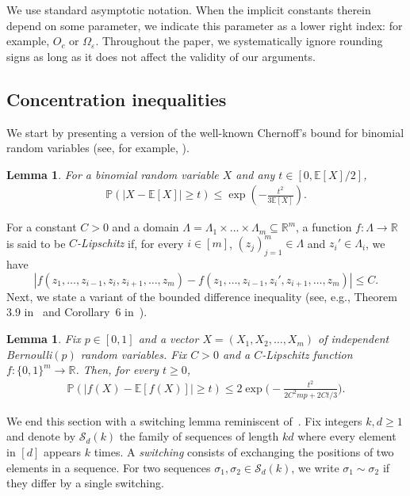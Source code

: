 \documentclass[reqno,final,a4paper]{amsart}
\newtheorem{lemma}[thm]{Lemma}
\theoremstyle{definition}
\newcommand{\cS}{\mathcal{S}}
\def\eps{\varepsilon}
\newcommand{\1}{\mathbbm{1}}
\begin{document}
We use standard asymptotic notation. When the implicit constants therein depend on some parameter, we indicate this parameter as a lower right index: for example, $O_c$ or $\Omega_\eps$. Throughout the paper, we systematically ignore rounding signs as long as it does not affect the validity of our arguments.

\subsection{Concentration inequalities}
We start by presenting a version of the well-known Chernoff's bound for binomial random variables (see, for example, \cite[Theorem 2.1]{JLR00}).
\begin{lemma}\label{chernoff}
For a binomial random variable $X$ and any $t\in [0,\mathbb E[X]/2]$, 
\begin{align*}
\mathbb{P}\left(\big|X-\mathbb E[X]\big|\ge t\right)\le \exp\left(-\frac{t^2}{3\mathbb E[X]}\right).
\end{align*}
\end{lemma}

For a constant $C > 0$ and a domain $\Lambda = \Lambda_1\times\ldots\times \Lambda_m\subseteq \mathbb R^m$, a function $f: \Lambda\to \mathbb R$ is said to be \emph{$C$-Lipschitz} if, for every $i\in [m]$, $(z_j)_{j=1}^m\in \Lambda$ and $z_i'\in \Lambda_i$, we have
\[|f(z_1,\ldots, z_{i-1}, z_i, z_{i+1},\ldots, z_m) - f(z_1,\ldots, z_{i-1}, z_i', z_{i+1},\ldots , z_m)| \le C.\]
Next, we state a variant of the bounded difference inequality (see, e.g., Theorem 3.9 in~\cite{M98} and Corollary~6 in~\cite{War16}).

\begin{lemma}\label{azuma}
Fix $p\in [0,1]$ and a vector $X = (X_1,X_2,\ldots, X_m)$ of independent Bernoulli$(p)$ random variables.
Fix $C>0$ and a $C$-Lipschitz function $f:\{0,1\}^m\to \mathbb R$. Then, for every $t\ge 0$,
\begin{align*}
\mathbb{P}\left(\big|f(X)-\mathbb{E}\left[f(X)\right]\big|\ge t\right)\le 2\exp\bigg(-\frac{t^2}{2C^2mp+2Ct/3}\bigg).
\end{align*}
\end{lemma}

We end this section with a switching lemma reminiscent of~\cite[Theorem~2.19]{Wor99}.
Fix integers $k,d\ge 1$ and denote by $\cS_d(k)$ the family of sequences of length $kd$ where every element in $[d]$ appears $k$ times.
A \emph{switching} consists of exchanging the positions of two elements in a sequence. 
For two sequences $\sigma_1,\sigma_2\in \cS_d(k)$, we write $\sigma_1\sim \sigma_2$ if they differ by a single switching.
\end{document}
